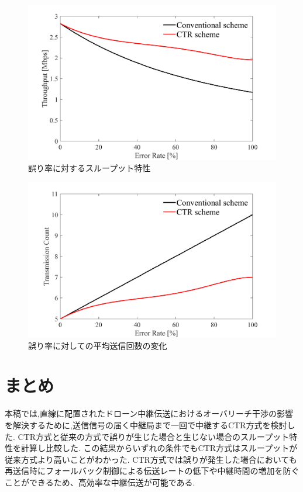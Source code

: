 \documentclass[a4paper,10.5pt]{ltjsarticle}  %
\begin{document}
\begin{figure}[H]
  \centering
  \includegraphics[width=\linewidth]{throughput_probabilistic_retry_v3.pdf} %
  \caption{誤り率に対するスループット特性}
  \label{fig:throughput_v3} %
\end{figure}
\begin{figure}[H]
  \centering
  \includegraphics[width=\linewidth]{throughput_probabilistic_retry_v3.1.pdf} %
  \caption{誤り率に対しての平均送信回数の変化}
  \label{fig:throughput_v3.1} %
\end{figure}

\section{まとめ}
本稿では,直線に配置されたドローン中継伝送におけるオーバリーチ干渉の影響を解決するために,送信信号の届く中継局まで一回で中継するCTR方式を検討した.
CTR方式と従来の方式で誤りが生じた場合と生じない場合のスループット特性を計算し比較した.
この結果からいずれの条件でもCTR方式はスループットが従来方式より高いことがわかった.
CTR方式では誤りが発生した場合においても再送信時にフォールバック制御による伝送レートの低下や中継時間の増加を防ぐことができるため、高効率な中継伝送が可能である.
\end{document}
